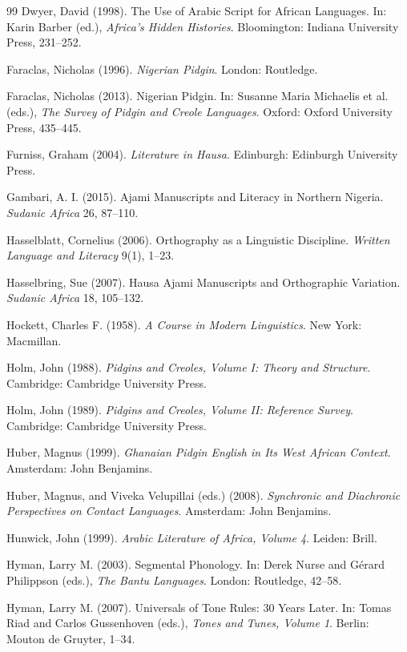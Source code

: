 \documentclass[12pt]{article}
\begin{document}
\begin{thebibliography}{99}
Dwyer, David (1998).
The Use of Arabic Script for African Languages.
In: Karin Barber (ed.),
\textit{Africa's Hidden Histories}.
Bloomington: Indiana University Press, 231--252.

Faraclas, Nicholas (1996).
\textit{Nigerian Pidgin}.
London: Routledge.

Faraclas, Nicholas (2013).
Nigerian Pidgin.
In: Susanne Maria Michaelis et al. (eds.),
\textit{The Survey of Pidgin and Creole Languages}.
Oxford: Oxford University Press, 435--445.

Furniss, Graham (2004).
\textit{Literature in Hausa}.
Edinburgh: Edinburgh University Press.

Gambari, A. I. (2015).
Ajami Manuscripts and Literacy in Northern Nigeria.
\textit{Sudanic Africa} 26, 87--110.

Hasselblatt, Cornelius (2006).
Orthography as a Linguistic Discipline.
\textit{Written Language and Literacy} 9(1), 1--23.

Hasselbring, Sue (2007).
Hausa Ajami Manuscripts and Orthographic Variation.
\textit{Sudanic Africa} 18, 105--132.

Hockett, Charles F. (1958).
\textit{A Course in Modern Linguistics}.
New York: Macmillan.

Holm, John (1988).
\textit{Pidgins and Creoles, Volume I: Theory and Structure}.
Cambridge: Cambridge University Press.

Holm, John (1989).
\textit{Pidgins and Creoles, Volume II: Reference Survey}.
Cambridge: Cambridge University Press.

Huber, Magnus (1999).
\textit{Ghanaian Pidgin English in Its West African Context}.
Amsterdam: John Benjamins.

Huber, Magnus, and Viveka Velupillai (eds.) (2008).
\textit{Synchronic and Diachronic Perspectives on Contact Languages}.
Amsterdam: John Benjamins.

Hunwick, John (1999).
\textit{Arabic Literature of Africa, Volume 4}.
Leiden: Brill.

Hyman, Larry M. (2003).
Segmental Phonology.
In: Derek Nurse and Gérard Philippson (eds.),
\textit{The Bantu Languages}.
London: Routledge, 42--58.

Hyman, Larry M. (2007).
Universals of Tone Rules: 30 Years Later.
In: Tomas Riad and Carlos Gussenhoven (eds.),
\textit{Tones and Tunes, Volume 1}.
Berlin: Mouton de Gruyter, 1--34.


\end{thebibliography}
\end{document}

